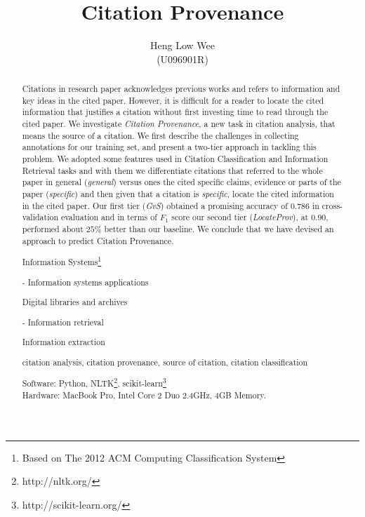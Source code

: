 \documentclass[hyp, 12pt]{socreport}
\begin{document}
\title{Citation Provenance}
\author{Heng Low Wee \\ (U096901R)}
\maketitle
\begin{abstract}
Citations in research paper acknowledges previous works and refers to information and key ideas in the cited paper. However, it is difficult for a reader to locate the cited information that justifies a citation without first investing time to read through the cited paper. We investigate {\it Citation Provenance}, a new task in citation analysis, that means the source of a citation. We first describe the challenges in collecting annotations for our training set, and present a two-tier approach in tackling this problem. We adopted some features used in Citation Classification and Information Retrieval tasks and with them we differentiate citations that referred to the whole paper in general ({\it general}) versus ones the cited specific claims, evidence or parts of the paper ({\it specific}) and then given that a citation is {\it specific}, locate the cited information in the cited paper. Our first tier ({\it GvS}) obtained a promising accuracy of $0.786$ in cross-validation evaluation and in terms of $F_1$ score our second tier ({\it LocateProv}), at $0.90$, performed about $25\%$ better than our baseline. We conclude that we have devised an approach to predict Citation Provenance.

\begin{descriptors}
	\item Information Systems\footnote{Based on The 2012 ACM Computing Classification System}
	{\setlength\itemindent{30pt} \item - Information systems applications}
	{\setlength\itemindent{50pt} \item Digital libraries and archives}
	{\setlength\itemindent{30pt} \item - Information retrieval}
	{\setlength\itemindent{50pt} \item Information extraction}
\end{descriptors}
\begin{keywords}
	citation analysis, citation provenance, source of citation, citation classification
\end{keywords}
\begin{implement}
\begin{flushleft}
\hspace{5 mm}Software: Python, NLTK\footnote{http://nltk.org/}, scikit-learn\footnote{http://scikit-learn.org/} \nocite{scikit-learn}\\
\hspace{5 mm}Hardware: MacBook Pro, Intel Core 2 Duo 2.4GHz, 4GB Memory.
\end{flushleft}
\end{implement}
\end{abstract}
\end{document}
